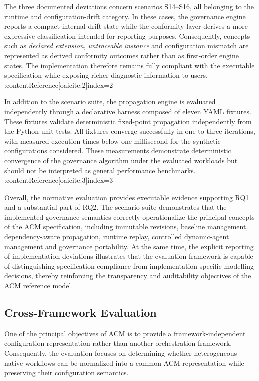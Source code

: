 \documentclass[10pt]{article}
\begin{document}
The three documented deviations concern scenarios S14--S16, all belonging to the runtime and configuration-drift category. In these cases, the governance engine reports a compact internal drift state while the conformity layer derives a more expressive classification intended for reporting purposes. Consequently, concepts such as \emph{declared extension}, \emph{untraceable instance} and configuration mismatch are represented as derived conformity outcomes rather than as first-order engine states. The implementation therefore remains fully compliant with the executable specification while exposing richer diagnostic information to users. :contentReference[oaicite:2]{index=2}

In addition to the scenario suite, the propagation engine is evaluated independently through a declarative harness composed of eleven YAML fixtures. These fixtures validate deterministic fixed-point propagation independently from the Python unit tests. All fixtures converge successfully in one to three iterations, with measured execution times below one millisecond for the synthetic configurations considered. These measurements demonstrate deterministic convergence of the governance algorithm under the evaluated workloads but should not be interpreted as general performance benchmarks. :contentReference[oaicite:3]{index=3}

Overall, the normative evaluation provides executable evidence supporting RQ1 and a substantial part of RQ2. The scenario suite demonstrates that the implemented governance semantics correctly operationalize the principal concepts of the ACM specification, including immutable revisions, baseline management, dependency-aware propagation, runtime replay, controlled dynamic-agent management and governance portability. At the same time, the explicit reporting of implementation deviations illustrates that the evaluation framework is capable of distinguishing specification compliance from implementation-specific modelling decisions, thereby reinforcing the transparency and auditability objectives of the ACM reference model.

\subsection{Cross-Framework Evaluation}
\label{sec:cross_framework_evaluation}

One of the principal objectives of ACM is to provide a framework-independent configuration representation rather than another orchestration framework. Consequently, the evaluation focuses on determining whether heterogeneous native workflows can be normalized into a common ACM representation while preserving their configuration semantics.
\end{document}
